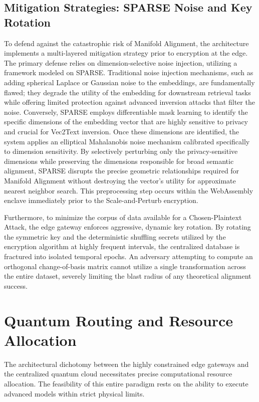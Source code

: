 \documentclass[12pt]{article}
\begin{document}
\subsection{Mitigation Strategies: SPARSE Noise and Key Rotation}

To defend against the catastrophic risk of Manifold Alignment, the architecture implements a multi-layered mitigation strategy prior to encryption at the edge. The primary defense relies on dimension-selective noise injection, utilizing a framework modeled on SPARSE. Traditional noise injection mechanisms, such as adding spherical Laplace or Gaussian noise to the embeddings, are fundamentally flawed; they degrade the utility of the embedding for downstream retrieval tasks while offering limited protection against advanced inversion attacks that filter the noise. Conversely, SPARSE employs differentiable mask learning to identify the specific dimensions of the embedding vector that are highly sensitive to privacy and crucial for Vec2Text inversion. Once these dimensions are identified, the system applies an elliptical Mahalanobis noise mechanism calibrated specifically to dimension sensitivity. By selectively perturbing only the privacy-sensitive dimensions while preserving the dimensions responsible for broad semantic alignment, SPARSE disrupts the precise geometric relationships required for Manifold Alignment without destroying the vector's utility for approximate nearest neighbor search. This preprocessing step occurs within the WebAssembly enclave immediately prior to the Scale-and-Perturb encryption.

Furthermore, to minimize the corpus of data available for a Chosen-Plaintext Attack, the edge gateway enforces aggressive, dynamic key rotation. By rotating the symmetric key and the deterministic shuffling secrets utilized by the encryption algorithm at highly frequent intervals, the centralized database is fractured into isolated temporal epochs. An adversary attempting to compute an orthogonal change-of-basis matrix cannot utilize a single transformation across the entire dataset, severely limiting the blast radius of any theoretical alignment success.

\section{Quantum Routing and Resource Allocation}

The architectural dichotomy between the highly constrained edge gateways and the centralized quantum cloud necessitates precise computational resource allocation. The feasibility of this entire paradigm rests on the ability to execute advanced models within strict physical limits.
\end{document}
